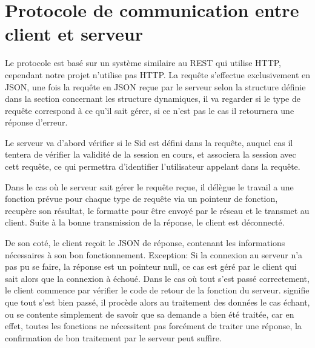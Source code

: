 % 
\section{Protocole de communication entre client et serveur}
Le protocole est basé sur un système similaire au REST qui utilise HTTP, cependant notre projet n'utilise pas HTTP.
La requête s'effectue exclusivement en JSON, une fois la requête en JSON reçue par le serveur selon la structure définie dans la section concernant les structure dynamiques, il va regarder si le type de requête correspond à ce qu'il sait gérer, si ce n'est pas le cas il retournera une réponse d'erreur.\par
Le serveur va d'abord vérifier si le Sid est défini dans la requête, auquel cas il tentera de vérifier la validité de la session en cours, et associera la session avec cett requête, ce qui permettra d'identifier l'utilisateur appelant dans la requête.\par
Dans le cas où le serveur sait gérer le requête reçue, il délègue le travail a une fonction prévue pour chaque type de requête via un pointeur de fonction, recupère son résultat, le formatte pour être envoyé par le réseau et le transmet au client. Suite à la bonne transmission de la réponse, le client est déconnecté.\par

De son coté, le client reçoit le JSON de réponse, contenant les informations nécessaires à son bon fonctionnement. Exception: Si la connexion au serveur n'a pas pu se faire, la réponse est un pointeur null, ce cas est géré par le client qui sait alors que la connexion à échoué. Dans le cas où tout s'est passé correctement, le client commence par vérifier le code de retour de la fonction du serveur.  \fg signifie que tout s'est bien passé, il procède alors au traitement des données le cas échant, ou se contente simplement de savoir que sa demande a bien été traitée, car en effet, toutes les fonctions ne nécessitent pas forcément de traiter une réponse, la confirmation de bon traitement par le serveur peut suffire.\par

